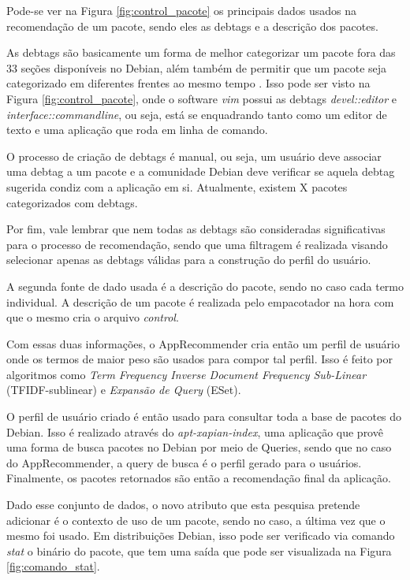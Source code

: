 Pode-se ver na Figura \ref{fig:control_pacote} os principais dados usados na
recomendação de um pacote, sendo eles as debtags e a descrição dos pacotes.

As debtags são basicamente um forma de melhor categorizar um pacote fora das 33
seções disponíveis no Debian, além também de permitir que um pacote seja
categorizado em diferentes frentes ao mesmo tempo \cite{zini2005cute}. Isso pode ser visto na Figura
\ref{fig:control_pacote}, onde o software \textit{vim} possui as debtags
\textit{devel::editor} e \textit{interface::commandline}, ou seja, está se
enquadrando tanto como um editor de texto e uma aplicação que roda em linha de
comando.

O processo de criação de debtags é manual, ou seja, um usuário deve associar uma
debtag a um pacote e a comunidade Debian deve verificar se aquela debtag
sugerida condiz com a aplicação em si. Atualmente, existem X pacotes
categorizados com debtags.

Por fim, vale lembrar que nem todas as debtags são consideradas significativas
para o processo de recomendação, sendo que uma filtragem é realizada visando
selecionar apenas as debtags válidas para a construção do perfil do usuário.

A segunda fonte de dado usada é a descrição do pacote, sendo no caso cada termo
individual. A descrição de um pacote é realizada pelo empacotador na hora com
que o mesmo cria o arquivo \textit{control}.

Com essas duas informações, o AppRecommender cria então um perfil de usuário
onde os termos de maior peso são usados para compor tal perfil. Isso é feito por
algoritmos como \textit{Term Frequency Inverse Document Frequency Sub-Linear}
(TFIDF-sublinear) e \textit{Expansão de Query} (ESet).

O perfil de usuário criado é então usado para consultar toda a base de pacotes
do Debian. Isso é realizado através do \textit{apt-xapian-index}, uma aplicação
que provê uma forma de busca pacotes no Debian por meio de Queries, sendo que no
caso do AppRecommender, a query de busca é o perfil gerado para o usuários.
Finalmente, os pacotes retornados são então a recomendação final da aplicação.

Dado esse conjunto de dados, o novo atributo que esta pesquisa pretende
adicionar é o contexto de uso de um pacote, sendo no caso, a última vez que o
mesmo foi usado. Em distribuições Debian, isso pode ser verificado via comando
\textit{stat} o binário do pacote, que tem uma saída que pode ser visualizada na Figura
\ref{fig:comando_stat}.

